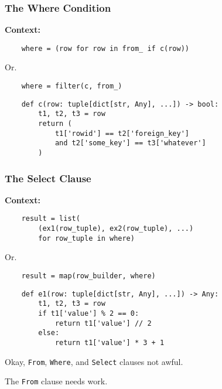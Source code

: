 \documentclass{beamer}
\begin{document}
\begin{frame}[fragile]
    \frametitle{The Where Condition}
    \textbf{Context:}

    \begin{verbatim}
    where = (row for row in from_ if c(row))
    \end{verbatim}

    Or.

    \begin{verbatim}
    where = filter(c, from_)
    \end{verbatim}


    \vspace{1em}
    \begin{verbatim}
    def c(row: tuple[dict[str, Any], ...]) -> bool:
        t1, t2, t3 = row
        return (
            t1['rowid'] == t2['foreign_key']
            and t2['some_key'] == t3['whatever']
        )
    \end{verbatim}


\end{frame}

\begin{frame}[fragile]
    \frametitle{The Select Clause}
    \textbf{Context:}

    \begin{verbatim}
    result = list(
        (ex1(row_tuple), ex2(row_tuple), ...)
        for row_tuple in where)
    \end{verbatim}

    Or.

    \begin{verbatim}
    result = map(row_builder, where)
    \end{verbatim}

    \vspace{1em}
    \begin{verbatim}
    def e1(row: tuple[dict[str, Any], ...]) -> Any:
        t1, t2, t3 = row
        if t1['value'] % 2 == 0:
            return t1['value'] // 2
        else:
            return t1['value'] * 3 + 1
    \end{verbatim}

\end{frame}

\begin{frame}
    Okay, \texttt{From}, \texttt{Where}, and \texttt{Select} clauses not awful. \pause

    \vspace{1em}

    The \texttt{From} clause needs work.
\end{frame}
\end{document}

